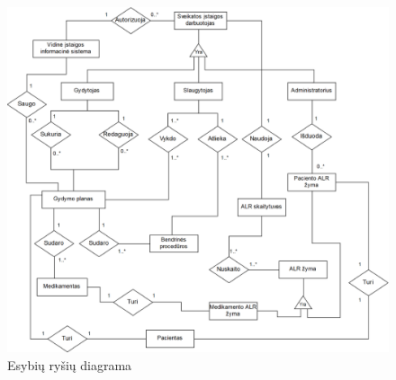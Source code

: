 \begin{figure}[H]
    \centering
    \includegraphics[scale=0.25]{images/erDiagrama}
    \caption{Esybių ryšių diagrama}
\end{figure}

